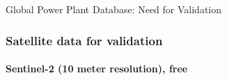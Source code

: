 \documentclass[color=usenames,dvipsnames]{beamer}
\begin{document}
\begin{frame}{Global Power Plant Database: Need for Validation}



\end{frame}


\begin{frame}

\frametitle{Satellite data for validation}


\framesubtitle{Sentinel-2 (10 meter resolution), free}

\end{frame}
\end{document}
